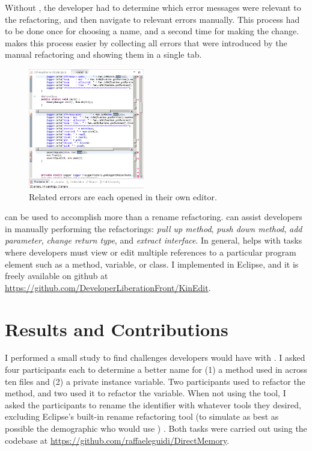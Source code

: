 \documentclass{sigplanconf}
\begin{document}
Without \pname{}, the developer had to determine which error messages were
relevant to the refactoring, and then navigate to relevant errors manually. This
process had to be done once for choosing a name, and a second time for making
the change. \pname{} makes this process easier by collecting all errors that
were introduced by the manual refactoring and showing them in a single tab.

\begin{figure}[h]
\begin{center}
\includegraphics[width=0.45\textwidth]{multiple-editors.png}
\caption{Related errors are each opened in their own editor.\label{mult}}
\end{center}
\end{figure}

\pname{} can be used to accomplish more than a rename refactoring.
\pname{} can assist developers in manually performing the refactorings:
\textit{pull up method}, \textit{push down method}, \textit{add parameter},
\textit{change return type}, and \textit{extract interface}.
In general,
\pname{} helps with tasks where developers must view or edit multiple
references to a particular program element such as a method, variable, or
class.
I implemented \pname{} in Eclipse, and it is freely available on
github at \url{https://github.com/DeveloperLiberationFront/KinEdit}.

\section{Results and Contributions}
I performed a small study to find challenges developers would have with
\pname{}. I asked four participants each to determine a better name for (1) a
method used in across ten files and (2) a private instance variable.  Two
participants used \pname{} to refactor the method, and two used it to refactor
the variable.  When not using the tool, I asked the participants to rename the
identifier with whatever tools they desired, excluding Eclipse's built-in rename
refactoring tool (to simulate as best as possible the demographic who would use
\pname{}) . Both tasks were carried out using the codebase at
\url{https://github.com/raffaeleguidi/DirectMemory}.
\end{document}
